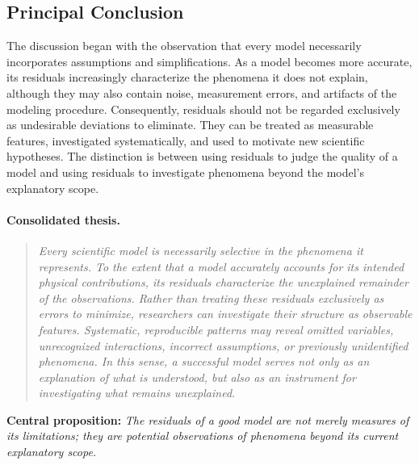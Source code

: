 \subsection{Principal Conclusion}
The discussion began with the observation that every model necessarily incorporates assumptions and simplifications.
As a model becomes more accurate, its residuals increasingly characterize the phenomena it does not explain, although they may also contain noise, measurement errors, and artifacts of the modeling procedure.
Consequently, residuals should not be regarded exclusively as undesirable deviations to eliminate.
They can be treated as measurable features, investigated systematically, and used to motivate new scientific hypotheses.
The distinction is between using residuals to judge the quality of a model and using residuals to investigate phenomena beyond the model's explanatory scope.
\paragraph{Consolidated thesis.}
\begin{quote}\itshape Every scientific model is necessarily selective in the phenomena it represents. To the extent that a model accurately accounts for its intended physical contributions, its residuals characterize the unexplained remainder of the observations. Rather than treating these residuals exclusively as errors to minimize, researchers can investigate their structure as observable features. Systematic, reproducible patterns may reveal omitted variables, unrecognized interactions, incorrect assumptions, or previously unidentified phenomena. In this sense, a successful model serves not only as an explanation of what is understood, but also as an instrument for investigating what remains unexplained.\end{quote}
\noindent\textbf{Central proposition:} \emph{The residuals of a good model are not merely measures of its limitations; they are potential observations of phenomena beyond its current explanatory scope.}

